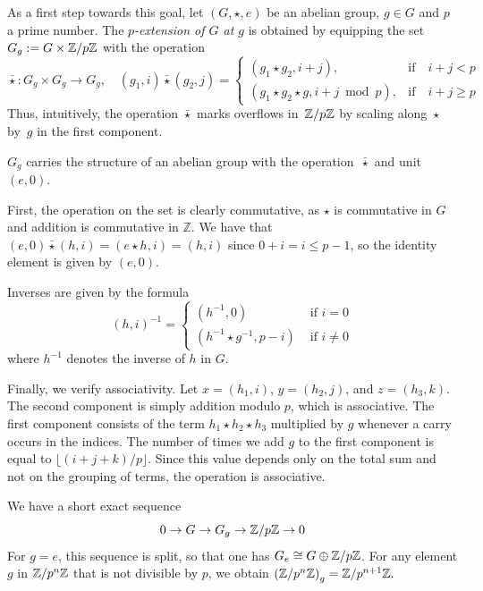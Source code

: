 \documentclass[runningheads]{llncs}
\begin{document}
As a first step towards this goal, let $(G, \star, e)$ be an abelian group,  $g \in G$ and $p$ a prime number.
The \emph{$p$-extension of $G$ at $g$} is obtained by equipping the set $G_g := G \times\mathbb{Z}/ p\mathbb{Z}$ with the operation
\begin{equation*}
\bar\star\colon G_g\times G_g\to G_g,
\quad
(g_1, i) \bar\star (g_2, j) 
 =
\begin{cases}
        (g_1\star g_2, i+j), &\text{if}\quad i+j < p 
        \\ 
        (g_1\star g_2 \star g, i+j \bmod p ), &\text{if}\quad i+j \geq p
\end{cases}
\end{equation*}
Thus, intuitively, the operation $\bar\star$ marks overflows in~$\mathbb{Z} /{p}\mathbb{Z}$ by scaling along~$\star$ by~$g$ in the first component. 
\begin{propositionE}
\label{prop:extension}
$G_g$ carries the structure of an abelian group with the operation~$\bar\star$ and unit $(e,0)$.
\end{propositionE}
\begin{proofE}
First, the operation on the set is clearly commutative, as $\star$ is commutative in $G$ and addition is commutative in $\mathbb{Z}$.
We have that $(e,0)\bar \star(h, i) = (e\star h, i) = (h,i)$ since $0+i = i \leq p-1$, so the identity element is given by $(e, 0)$.
    
Inverses are given by the formula
\begin{equation*}
(h,i)^{-1} = 
\begin{cases}
(h^{-1}, 0) &\mbox{ if } i =0
\\
(h^{-1} \star g^{-1}, p-i) &\mbox{ if } i \neq 0
\end{cases}
\end{equation*}
where $h^{-1}$ denotes the inverse of $h$ in $G$.

Finally, we verify associativity. Let $x=(h_1, i)$, $y=(h_2, j)$, and $z=(h_3, k)$. 
The second component is simply addition modulo $p$, which is associative. 
The first component consists of the term $h_1 \star h_2 \star h_3$ multiplied by $g$ whenever a carry occurs in the indices. 
The number of times we add $g$ to the first component is equal to $\lfloor (i+j+k)/p \rfloor$. 
Since this value depends only on the total sum and not on the grouping of terms, the operation is associative.
\end{proofE}


\begin{example}
We have a short exact sequence
\begin{equation*}
0 \to G \to G_g \to \mathbb{Z}/p\mathbb{Z} \to 0
\end{equation*}
For $g=e$, this sequence is split, so that one has  $G_e \cong G\oplus \mathbb{Z}/ p\mathbb{Z}$. For any element $g$ in $\mathbb{Z}/p^n \mathbb{Z}$ that is not divisible by $p$, we obtain $\left(\mathbb{Z}/p^n \mathbb{Z} \right)_g = \mathbb{Z}/p^{n+1} \mathbb{Z}.$
\end{example}
\end{document}
